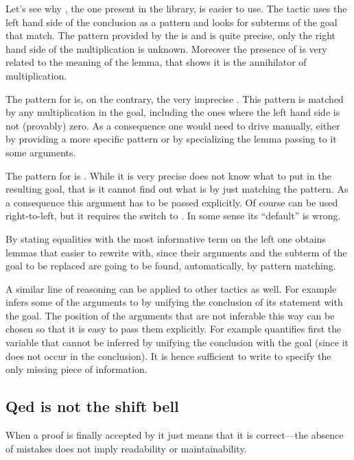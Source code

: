 Let's see why , the one present in the library, is easier to use.
The  tactic uses the left hand side of the conclusion as
a pattern and looks for subterms of the goal that match.
The pattern
provided by the  is  and is quite precise, only the
right hand side of the multiplication is unknown. Moreover the presence of
 is very related to the meaning of the lemma, that shows it is
the annihilator of multiplication.

The pattern for
 is, on the contrary, the very imprecise \C{(\_ * \_)}.
This pattern is matched by any multiplication in the goal, including
the ones where the left hand side is not (provably) zero. As a consequence
one would need to drive  manually, either by providing
a more specific pattern or by specializing the lemma passing to it
some arguments.

The pattern for  is . While it is very precise
 does not know what to put in the resulting goal, that is
it cannot find out what  is by just matching the pattern.
As a consequence this argument has to be passed explicitly.
Of course  can be used right-to-left, but it requires the
\C{$~$-}
switch to . In some sense its ``default'' is wrong.

By stating equalities with the most informative term on the left one
obtains lemmas that easier to rewrite with, since their
arguments and the subterm of the goal to be replaced are going to be
found, automatically, by pattern matching.

A similar line of reasoning can be applied to other tactics as well. For
example  infers some of the arguments to  by unifying the
conclusion of its statement with the goal. The position of the arguments that
are not inferable this way can be chosen so that it is easy to pass them
explicitly.  For example  quantifies first the variable that cannot be inferred by unifying the
conclusion with the goal (since it does not occur in the conclusion).
It is hence sufficient to write  to specify the only
missing piece of information.

\subsection{Qed is not the shift bell}

When a proof is finally accepted by \Coq{} it just means that it is
correct---the absence of mistakes does not imply readability or maintainability.

